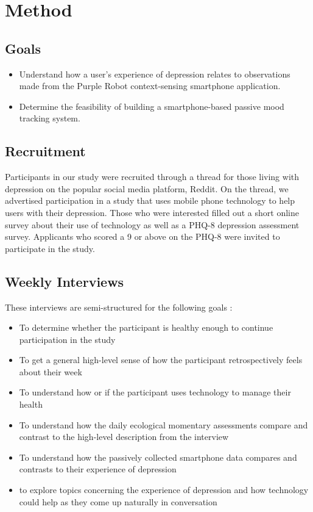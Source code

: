 \section{Method}

\subsection{Goals}

\begin{itemize}
\item Understand how a user's experience of depression relates to observations made from 
the Purple Robot context-sensing smartphone application.
\item Determine the feasibility of building a smartphone-based passive mood tracking system.
\end{itemize}

\subsection{Recruitment}
Participants in our study were recruited through a thread 
for those living with depression on the popular social media platform, Reddit.
On the thread, we advertised participation in a study that uses 
mobile phone technology to help users with their depression. Those
who were interested filled out a short online survey 
about their use of technology as well as a PHQ-8 depression assessment survey.
Applicants who scored a 9 or above on the PHQ-8 were invited to participate
in the study.

\subsection{Weekly Interviews}
These interviews are semi-structured for the following goals :

\begin{itemize}
\item To determine whether the participant is healthy enough to continue participation in the study
\item To get a general high-level sense of how the participant retrospectively feels about their week
\item To understand how or if the participant uses technology to manage their health
\item To understand how the daily ecological momentary assessments compare and contrast to the high-level
description from the interview
\item To understand how the passively collected smartphone data compares and contrasts to their 
experience of depression
\item to explore topics concerning the experience of depression and how technology could help as they come up naturally in conversation
\end{itemize}


